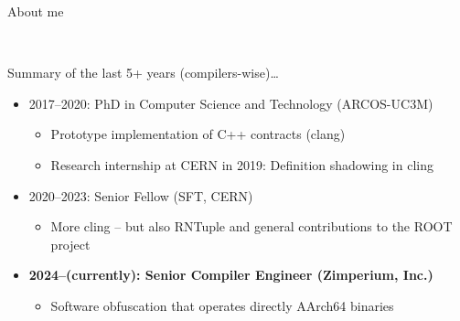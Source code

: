 \begin{frame}{About me}
  \begin{raggedleft}
    \\
  \end{raggedleft}

  \vfill
  Summary of the last 5+ years (compilers-wise)\ldots{}
  \begin{itemize}
  \item 2017--2020: PhD in Computer Science and Technology (ARCOS-UC3M)
    \begin{itemize}
    \item Prototype implementation of C++ contracts (clang)
    \item Research internship at CERN in 2019: Definition shadowing in cling
    \end{itemize}
    \medskip

  \item 2020--2023: Senior Fellow (SFT, CERN)
    \begin{itemize}
    \item More cling -- but also RNTuple and general contributions to the ROOT project
    \end{itemize}
    \medskip

  \item \textbf{2024--(currently): Senior Compiler Engineer (Zimperium, Inc.)}
    \begin{itemize}
    \item Software obfuscation that operates directly AArch64 binaries
    \end{itemize}
  \end{itemize}
\end{frame}
